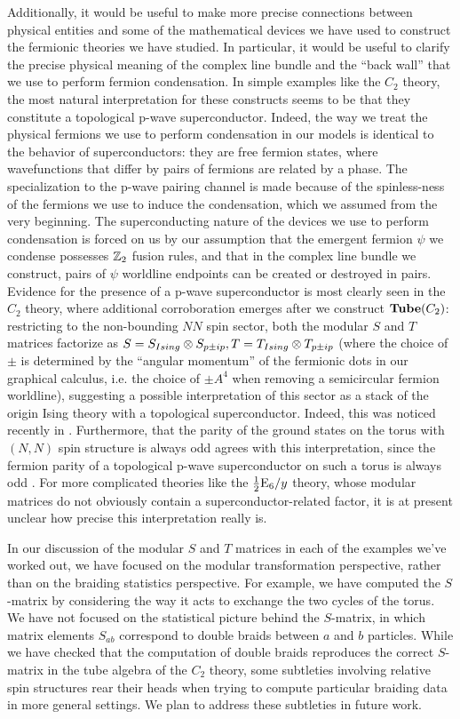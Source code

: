 Additionally, it would be useful to make more precise connections between physical entities and some of the mathematical 
devices we have used to construct the fermionic theories 
we have studied. 
In particular, it would be useful to clarify the precise physical meaning of the complex line bundle 
and the ``back wall'' that we use to perform fermion condensation. 
In simple examples like the $C_2$ theory, the most natural interpretation for these constructs 
seems to be that they constitute a topological p-wave superconductor.
Indeed, the way we treat the physical fermions we use to perform condensation 
in our models is identical to the behavior of 
superconductors: they are 
free fermion states, 
where wavefunctions that differ by pairs of 
fermions are related by a phase. 
The specialization to the p-wave pairing channel is made because of the spinless-ness
of the fermions we use to induce the condensation, which we assumed from the very 
beginning.  
The superconducting nature of the devices we use to perform condensation is forced on us
by our assumption that the emergent fermion $\psi$ we condense possesses $\mathbb{Z}_2$
fusion rules, and that in the complex line bundle we construct, pairs of
$\psi$ worldline endpoints can be created or destroyed in pairs. 
Evidence for the presence of a p-wave superconductor is most clearly seen in the $C_2$ theory, 
where additional corroboration emerges after we construct $\textbf{Tube}(C_2)$: 
restricting to the non-bounding $NN$ spin sector, both the modular $S$ and $T$ matrices 
factorize as $S=S_{Ising}\otimes S_{p\pm ip}, T = T_{Ising} \otimes T_{p\pm ip}$ (where the 
choice of $\pm$ is determined by the ``angular momentum'' of the fermionic dots 
in our graphical calculus, i.e. the choice of $\pm A^4$ when removing a semicircular fermion
worldline), suggesting a possible interpretation of this sector 
as a stack of the origin Ising theory with a topological superconductor. 
Indeed, this was noticed recently in \cite{ware2016}.
Furthermore, that the parity of the ground states on the torus with $(N,N)$ spin structure is always 
odd agrees with this interpretation, since the fermion parity of a topological 
p-wave superconductor on such a torus is always odd \cite{you2015}.
For more
complicated theories like the $\frac{1}{2}\text{E}_6/y$ theory, whose modular matrices do not obviously contain a superconductor-related factor, 
it is at present unclear how precise this interpretation really is. 

In our discussion of the modular $S$ and $T$ matrices in each of the examples we've worked out, 
we have focused on the modular transformation perspective, rather than on the braiding statistics perspective. 
For example, we have computed the $S$-matrix by considering the way it acts to exchange the two 
cycles of the torus. 
We have not focused on the statistical picture behind the $S$-matrix, in which matrix elements $S_{ab}$ correspond to double braids between $a$ and $b$ particles. 
While we have checked that the computation of double braids reproduces the correct $S$-matrix 
in the tube algebra of the $C_2$ theory, some subtleties involving relative spin structures rear their heads when trying to compute particular braiding data in more general settings. 
We plan to address these subtleties in future work. 

